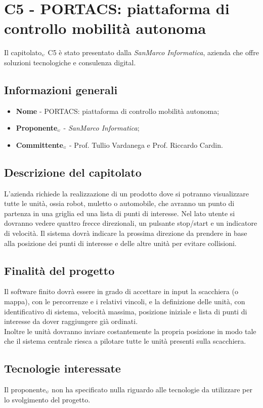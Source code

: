 \chapter{C5 - PORTACS: piattaforma di controllo mobilità autonoma} \label{CapitolatoC5}
Il capitolato$_{\scaleto{G}{3pt}}$ C5 è stato presentato dalla \textit{SanMarco Informatica}, azienda che offre soluzioni tecnologiche e consulenza digital.
\section{Informazioni generali} \label{C5InformazioniGenerali}
\begin{itemize}
	\item \textbf{Nome} - PORTACS: piattaforma di controllo mobilità autonoma;
	\item \textbf{Proponente}$_{\scaleto{G}{3pt}}$ - \textit{SanMarco Informatica};
	\item \textbf{Committente}$_{\scaleto{G}{3pt}}$ - Prof. Tullio Vardanega e Prof. Riccardo Cardin.
\end{itemize}
\section{Descrizione del capitolato} \label{C5DescrizioneDelCapitolato}
L'azienda richiede la realizzazione di un prodotto dove si potranno visualizzare tutte le unità, ossia robot, muletto o automobile, che avranno un punto di partenza in una griglia ed una lista di punti di interesse. Nel lato utente si dovranno vedere quattro frecce direzionali, un pulsante stop/start e un indicatore di velocità. Il sistema dovrà indicare la prossima direzione da prendere in base alla posizione dei punti di interesse e delle altre unità per evitare collisioni.
\section{Finalità del progetto} \label{C5FinalitàDelProgetto}
Il software finito dovrà essere in grado di accettare in input la scacchiera (o mappa), con le percorrenze e i relativi vincoli, e la definizione delle unità, con identificativo di sistema, velocità massima, posizione iniziale e lista di punti di interesse da dover raggiungere già ordinati. \\
Inoltre le unità dovranno inviare costantemente la propria posizione in modo tale che il sistema centrale riesca a pilotare tutte le unità presenti sulla scacchiera.
\section{Tecnologie interessate} \label{C5TecnologieInteressate}
Il proponente$_{\scaleto{G}{3pt}}$ non ha specificato nulla riguardo alle tecnologie da utilizzare per lo svolgimento del progetto.
